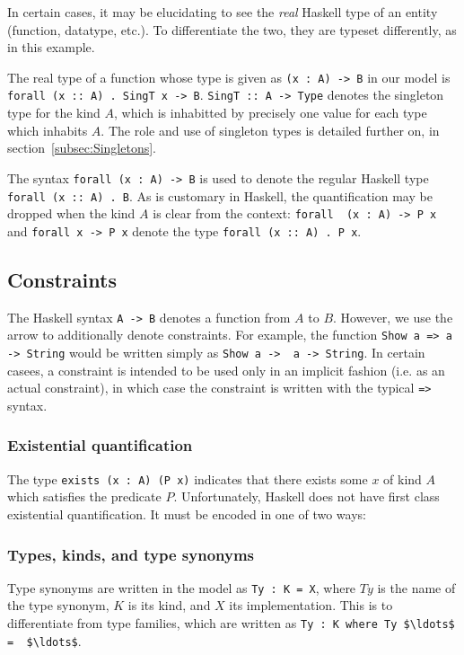 In certain cases, it may be elucidating to see the \emph{real} Haskell type of
an entity (function, datatype, etc.). To differentiate the two, they are typeset
differently, as in this example.

The real type of a function whose type is given as \lstinline!(x : A) -> B! in
our model is \texttt{forall (x :: A) . SingT x -> B}. \texttt{SingT :: A -> 
Type}
denotes the singleton type for the kind $A$, which is inhabitted by precisely
one value for each type which inhabits $A$. The role and use of singleton types
is detailed further on, in section~\ref{subsec:Singletons}. 

The syntax \lstinline!forall (x : A) -> B! is used to denote the regular
Haskell type \texttt{forall (x :: A) . B}. As is customary in Haskell, the 
quantification
may be dropped when the kind $A$ is clear from the context: \lstinline!forall 
(x : A) -> P x! and
\lstinline!forall x -> P x! denote the type \texttt{forall (x :: A) . P x}.

\subsection{Constraints}
The Haskell syntax \texttt{A -> B} denotes a function from $A$ to $B$. However,
we use the arrow to additionally denote constraints. For example, the function
\texttt{Show a => a -> String} would be written simply as \lstinline!Show a -> 
a -> String!.
In certain casees, a constraint is intended to be used only in an implicit 
fashion 
(i.e. as an actual constraint), in which case the constraint is written with 
the typical \lstinline{=>} syntax. 

\subsubsection*{Existential quantification}
The type \lstinline!exists (x : A) (P x)! indicates that there exists some $x$
of kind $A$ which satisfies the predicate $P$. Unfortunately, Haskell does not
have first class existential quantification. It must be encoded in one of
two ways:

\subsubsection*{Types, kinds, and type synonyms}
Type synonyms are written in the model as \lstinline!Ty : K = X!, where $Ty$ is 
the name
of the type synonym, $K$ is its kind, and $X$ its implementation. This is to 
differentiate
from type families, which are written as \lstinline!Ty : K where Ty $\ldots$ = 
$\ldots$!.

